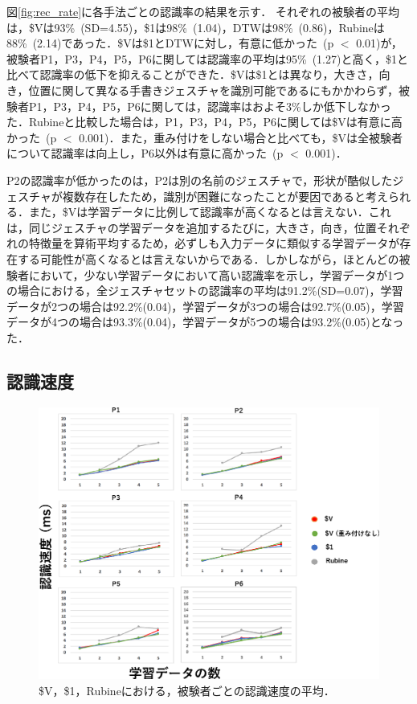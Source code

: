 図\ref{fig:rec_rate}に各手法ごとの認識率の結果を示す．
それぞれの被験者の平均は，\$Vは93\%~(SD=4.55)，\$1は98\%~(1.04)，DTWは98\%~(0.86)，Rubineは88\%~(2.14)であった．\$Vは\$1とDTWに対し，有意に低かった~(p $<$ 0.01)が，被験者P1，P3，P4，P5，P6に関しては認識率の平均は95\%~(1.27)と高く，\$1と比べて認識率の低下を抑えることができた．\$Vは\$1とは異なり，大きさ，向き，位置に関して異なる手書きジェスチャを識別可能であるにもかかわらず，被験者P1，P3，P4，P5，P6に関しては，認識率はおよそ3\%しか低下しなかった．Rubineと比較した場合は，P1，P3，P4，P5，P6に関しては\$Vは有意に高かった~(p $<$ 0.001)．また，重み付けをしない場合と比べても，\$Vは全被験者について認識率は向上し，P6以外は有意に高かった~(p $<$ 0.001)．

P2の認識率が低かったのは，P2は別の名前のジェスチャで，形状が酷似したジェスチャが複数存在したため，識別が困難になったことが要因であると考えられる．また，\$Vは学習データに比例して認識率が高くなるとは言えない．これは，同じジェスチャの学習データを追加するたびに，大きさ，向き，位置それぞれの特徴量を算術平均するため，必ずしも入力データに類似する学習データが存在する可能性が高くなるとは言えないからである．しかしながら，ほとんどの被験者において，少ない学習データにおいて高い認識率を示し，学習データが1つの場合における，全ジェスチャセットの認識率の平均は91.2\%(SD=0.07)，学習データが2つの場合は92.2\%(0.04)，学習データが3つの場合は92.7\%(0.05)，学習データが4つの場合は93.3\%(0.04)，学習データが5つの場合は93.2\%(0.05)となった．

\newpage
\subsection{認識速度}
\begin{figure}[!h]
\centering
\includegraphics[width=1.0\columnwidth]{img/rec_speed.eps}
\caption{\$V，\$1，Rubineにおける，被験者ごとの認識速度の平均．}
\label{fig:rec_speed}
\end{figure}

